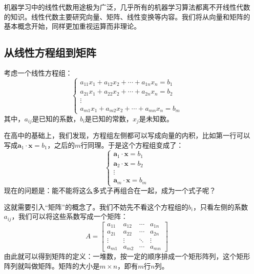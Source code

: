 机器学习中的线性代数用途极为广泛，几乎所有的机器学习算法都离不开线性代数的知识。线性代数主要研究向量、矩阵、线性变换等内容。我们将从向量和矩阵的基本概念开始，同样更加重视运算而非理论。

\subsection{从线性方程组到矩阵}

考虑一个线性方程组：
\begin{equation}
    \begin{cases}
        a_{11} x_1 + a_{12} x_2 + \cdots + a_{1n} x_n = b_1 \\
        a_{21} x_1 + a_{22} x_2 + \cdots + a_{2n} x_n = b_2 \\
        \vdots \\
        a_{m1} x_1 + a_{m2} x_2 + \cdots + a_{mn} x_n = b_m
    \end{cases}
\end{equation}
其中，$a_{ij}$是已知的系数，$b_i$是已知的常数，$x_j$是未知数。

在高中的基础上，我们发现，方程组左侧都可以写成向量的内积，比如第一行可以写成$\mathbf{a}_1 \cdot \mathbf{x} = b_1$，之后的$m$行同理。于是这个方程组变成了：
\begin{equation}
    \begin{cases}
        \mathbf{a}_1 \cdot \mathbf{x} = b_1 \\
        \mathbf{a}_2 \cdot \mathbf{x} = b_2 \\
        \vdots \\
        \mathbf{a}_m \cdot \mathbf{x} = b_m
    \end{cases}
\end{equation}
现在的问题是：能不能将这么多式子再组合在一起，成为一个式子呢？

这就需要引入“矩阵”的概念了。我们不妨先不看这个方程组的$b_i$，只看左侧的系数$a_{ij}$，我们可以将这些系数写成一个矩阵：
\begin{equation}
    A =
    \begin{bmatrix}
        a_{11} & a_{12} & \cdots & a_{1n} \\
        a_{21} & a_{22} & \cdots & a_{2n} \\
        \vdots & \vdots & \ddots & \vdots \\
        a_{m1} & a_{m2} & \cdots & a_{mn}
    \end{bmatrix}
\end{equation}
由此就可以得到矩阵的定义：一堆数，按一定的顺序排成一个矩形阵列，这个矩形阵列就叫做矩阵。矩阵的大小是$m \times n$，即有$m$行$n$列。

